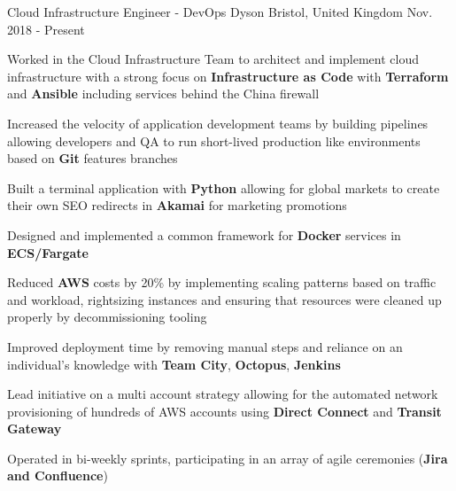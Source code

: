
\begin{cventries}

  \cventry
    {Cloud Infrastructure Engineer - DevOps} %
    {Dyson} %
    {Bristol, United Kingdom} %
    {Nov. 2018 - Present} %
    {
      \begin{cvitems} %
        \item {Worked in the Cloud Infrastructure Team to architect and implement cloud infrastructure with a strong focus on \textbf{Infrastructure as Code} with \textbf{Terraform} and \textbf{Ansible} including services behind the China firewall}
        \item {Increased the velocity of application development teams by building pipelines allowing developers and QA to run short-lived production like environments based on \textbf{Git} features branches}
        \item {Built a terminal application with \textbf{Python} allowing for global markets to create their own SEO redirects in \textbf{Akamai} for marketing promotions}
        \item {Designed and implemented a common framework for \textbf{Docker} services in \textbf{ECS/Fargate}}
        \item {Reduced \textbf{AWS} costs by 20\% by implementing scaling patterns based on traffic and workload, rightsizing instances and ensuring that resources were cleaned up properly by decommissioning tooling}
        \item {Improved deployment time by removing manual steps and reliance on an individual’s knowledge with \textbf{Team City}, \textbf{Octopus}, \textbf{Jenkins}}
        \item {Lead initiative on a multi account strategy allowing for the automated network provisioning of hundreds of AWS accounts using \textbf{Direct Connect} and \textbf{Transit Gateway}}
        \item {Operated in bi-weekly sprints, participating in an array of agile ceremonies (\textbf{Jira and Confluence})}
      \end{cvitems}
    }


\end{cventries}
